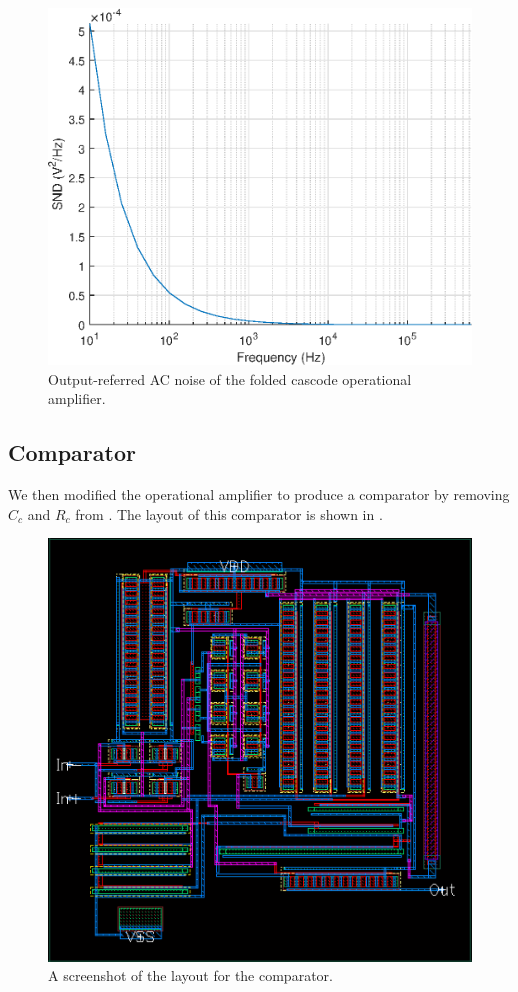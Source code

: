 \documentclass[journal,hidelinks]{IEEEtran}
\begin{document}
\begin{figure}[!htb]
  \centering
  \includegraphics[width=0.8\columnwidth]{circuit/folded_cascode/ac_noise.eps}
  \caption{Output-referred AC noise of the folded cascode operational amplifier.}
  \label{fig:folded_cascode_ac_noise}
\end{figure}

\subsection{Comparator}

We then modified the operational amplifier to produce a comparator by removing $C_c$ and $R_c$ from . The layout of this comparator is shown in .

\begin{figure}[!htb]
  \centering
  \includegraphics[width=0.8\columnwidth]{layout/comparator.png}
  \caption{A screenshot of the layout for the comparator.}
  \label{fig:comparator_layout}
\end{figure}
\end{document}
